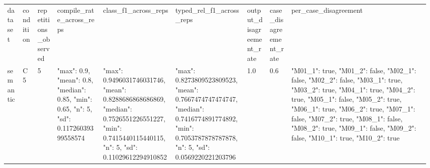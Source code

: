 \begin{tabular}{lllllllll}
dataset & condition & repetitions\_observed & compile\_rate\_across\_reps & class\_f1\_across\_reps & typed\_rel\_f1\_across\_reps & output\_disagreement\_rate & case\_disagreement\_rate & per\_case\_disagreement \\
semantic & C5 & 5 & {"max": 0.9, "mean": 0.8, "median": 0.85, "min": 0.65, "n": 5, "sd": 0.11726039399558574} & {"max": 0.9496031746031746, "mean": 0.8288686868686869, "median": 0.7526551226551227, "min": 0.7415440115440115, "n": 5, "sd": 0.11029612294910852} & {"max": 0.8273809523809523, "mean": 0.7667474747474747, "median": 0.7416774891774892, "min": 0.7053787878787878, "n": 5, "sd": 0.0569220221203796} & 1.0 & 0.6 & {"M01\_1": true, "M01\_2": false, "M02\_1": false, "M02\_2": false, "M03\_1": true, "M03\_2": true, "M04\_1": true, "M04\_2": true, "M05\_1": false, "M05\_2": true, "M06\_1": true, "M06\_2": true, "M07\_1": false, "M07\_2": true, "M08\_1": false, "M08\_2": true, "M09\_1": false, "M09\_2": false, "M10\_1": true, "M10\_2": true} \\
\end{tabular}